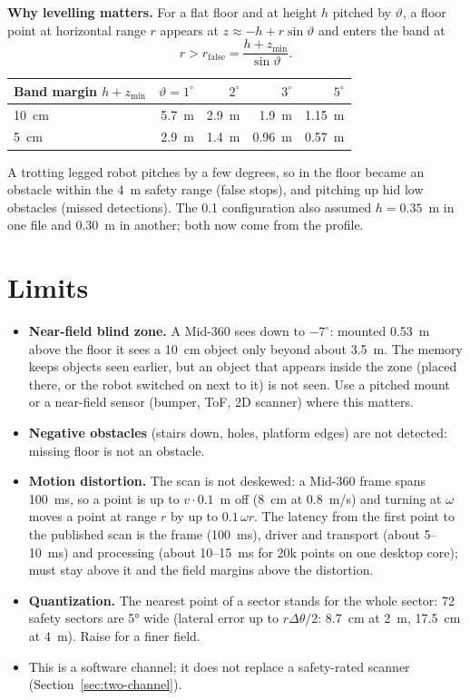 \textbf{Why levelling matters.} For a flat floor and  at height $h$ pitched by
$\vartheta$, a floor point at horizontal range $r$ appears at $z \approx -h + r\sin\vartheta$ and
enters the band at
\begin{equation}
  r > r_{\mathrm{false}} = \frac{h + z_{\min}}{\sin\vartheta}.
\end{equation}
\begin{center}
\begin{tabular}{@{}lrrrr@{}}
  \toprule
  Band margin $h + z_{\min}$ & $\vartheta = 1^\circ$ & $2^\circ$ & $3^\circ$ & $5^\circ$ \\
  \midrule
  10~cm & 5.7~m & 2.9~m & 1.9~m & 1.15~m \\
  5~cm & 2.9~m & 1.4~m & 0.96~m & 0.57~m \\
  \bottomrule
\end{tabular}
\end{center}
A trotting legged robot pitches by a few degrees, so in  the floor became an
obstacle within the 4~m safety range (false stops), and pitching up hid low obstacles (missed
detections). The 0.1 configuration also assumed $h = 0.35$~m in one file and 0.30~m in another;
both now come from the profile.

\section{Limits}
\label{sec:perception-limits}

\begin{itemize}
  \item \textbf{Near-field blind zone.} A Mid-360 sees down to $-7^\circ$: mounted 0.53~m above
    the floor it sees a 10~cm object only beyond about 3.5~m. The memory keeps objects seen
    earlier, but an object that appears inside the zone (placed there, or the robot switched on
    next to it) is not seen. Use a pitched mount or a near-field sensor (bumper, ToF, 2D
    scanner) where this matters.
  \item \textbf{Negative obstacles} (stairs down, holes, platform edges) are not detected:
    missing floor is not an obstacle.
  \item \textbf{Motion distortion.} The scan is not deskewed: a Mid-360 frame spans 100~ms, so
    a point is up to $v \cdot 0.1$~m off (8~cm at 0.8~m/s) and turning at $\omega$ moves a point
    at range $r$ by up to $0.1\,\omega r$. The latency from the first point to the published scan
    is the frame (100~ms), driver and transport (about 5--10~ms) and processing (about
    10--15~ms for 20k points on one desktop core);  must stay
    above it and the field margins above the distortion.
  \item \textbf{Quantization.} The nearest point of a sector stands for the whole sector: 72
    safety sectors are 5° wide (lateral error up to $r\Delta\theta/2$: 8.7~cm at 2~m, 17.5~cm at
    4~m). Raise  for a finer field.
  \item This is a software channel; it does not replace a safety-rated scanner
    (Section~\ref{sec:two-channel}).
\end{itemize}

